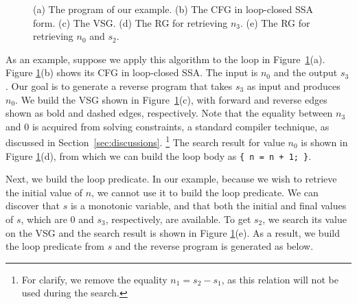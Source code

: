 \documentclass[12pt]{gatech-thesis}
\begin{document}
\begin{figure}%
\caption{(a) The program of our example. (b) The CFG in loop-closed SSA form. (c) The VSG.  (d) The RG for retrieving $n_3$. (e) The RG for retrieving $n_0$ and $s_2$.}
\label{fig:loop_vsg}
\end{figure}

As an example, suppose we apply this algorithm to the loop in Figure~\ref{fig:loop_vsg}(a).
Figure \ref{fig:loop_vsg}(b) shows its CFG in loop-closed SSA.
The input is $n_0$ and the output $s_3$.
Our goal is to generate a reverse program that takes $s_3$ as input and produces $n_0$.
We build the VSG shown in Figure~\ref{fig:loop_vsg}(c), with forward and reverse edges shown as bold and dashed edges, respectively.
Note that the equality between $n_3$ and 0 is acquired from solving constraints, a standard compiler technique, as discussed in Section~\ref{sec:discussions}.%
%
\footnote{For clarify, we remove the equality $n_1=s_2-s_1$, as this relation will not be used during the search.}
%
The search result for value $n_0$ is shown in Figure \ref{fig:loop_vsg}(d), from which we can build the loop body as \texttt{\{ n = n + 1;  \}}.

Next, we build the loop predicate.
In our example, because we wish to retrieve the initial value of $n$, we cannot use it to build the loop predicate.
We can discover that $s$ is a monotonic variable, and that both the initial and final values of $s$, which are 0 and $s_3$, respectively, are available.
To get $s_2$, we search its value on the VSG and the search result is shown in Figure \ref{fig:loop_vsg}(e). 
As a result, we build the loop predicate from $s$ and the reverse program is generated as below.
\end{document}
